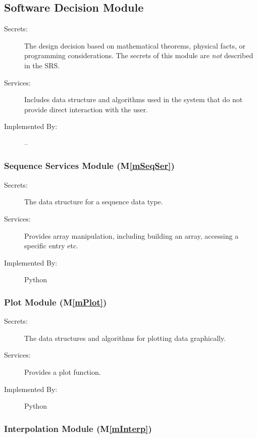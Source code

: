 \documentclass[12pt, titlepage]{article}
\newcommand{\mref}[1]{M\ref{#1}}
\begin{document}
\subsection{Software Decision Module}

\begin{description}
\item[Secrets:] The design decision based on mathematical theorems, physical
  facts, or programming considerations. The secrets of this module are
  \emph{not} described in the SRS.
\item[Services:] Includes data structure and algorithms used in the system that
  do not provide direct interaction with the user. 
\item[Implemented By:] --
\end{description}


\subsubsection{Sequence Services Module  (\mref{mSeqSer})}

\begin{description}
	\item[Secrets:] The data structure for a sequence data type.
	\item[Services:] Provides array manipulation, including building an array,
	accessing a specific entry etc.
	\item[Implemented By:] Python
\end{description} 

\subsubsection{Plot Module (\mref{mPlot})}

\begin{description}
	\item[Secrets:] The data structures and algorithms for plotting data graphically.
	\item[Services:] Provides a plot function.
	\item[Implemented By:] Python
\end{description}

\subsubsection{Interpolation Module (\mref{mInterp})}
\end{document}
